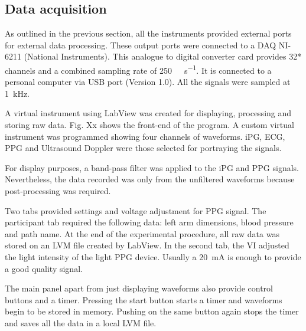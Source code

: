 


\subsection{Data acquisition}
\label{section procedure 1.2}

As outlined in the previous section, all the instruments provided external ports for external data processing. These output ports were connected to a DAQ NI-6211 (National Instruments). This analogue to digital converter card provides 32* channels and a combined sampling rate of \SI{250}{\kilo\sample\per\second}. It is connected to a personal computer via USB port (Version 1.0). All the signals were sampled at \SI{1}{\kilo\hertz}.


A virtual instrument using LabView was created for displaying, processing and storing raw data. Fig. Xx shows the front-end of the program. A custom virtual instrument was programmed showing four channels of waveforms. iPG, ECG, PPG and Ultrasound Doppler were those selected for portraying the signals.


For display purposes, a band-pass filter was applied to the iPG and PPG signals. Nevertheless, the data recorded  was only from the unfiltered waveforms because post-processing was required.  


Two tabs provided settings and voltage adjustment for PPG signal. The participant tab required the following data: left arm dimensions, blood pressure and path name. At the end of the experimental procedure, all raw data was stored on an LVM file created by LabView. In the second tab, the VI adjusted the light intensity of the light PPG device. Usually a \SI{20}{\milli\ampere} is enough to provide a good quality signal. 

The main panel apart from just displaying waveforms also provide control buttons and a timer.  Pressing the start button starts a timer and waveforms begin to be stored in memory. Pushing on the same button again stops the timer and saves all the data in a local LVM file. 

